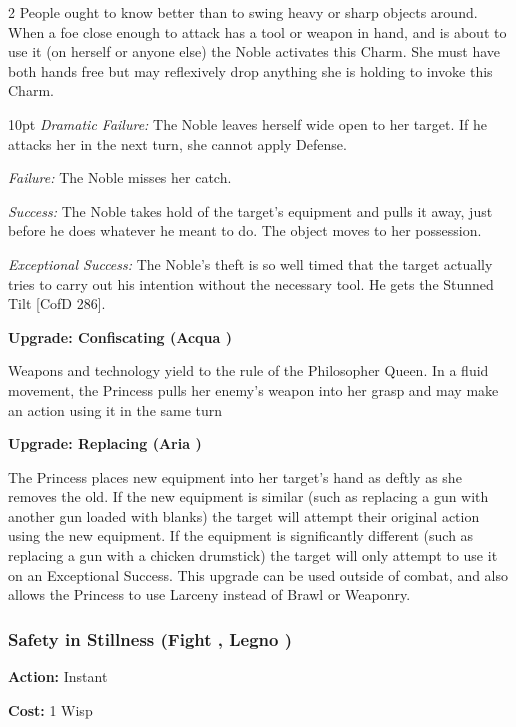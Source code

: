 \begin{multicols}{2}
\noindent People ought to know better than to swing heavy or sharp objects around. When a foe close enough to attack has a tool or weapon in hand, and is about to use it (on herself or anyone else) the Noble activates this Charm. She must have both hands free but may reflexively drop anything she is holding to invoke this Charm.

\begin{myindentpar}{10pt} 
\emph{Dramatic Failure:}  The Noble leaves herself wide open to her target. If he attacks her in the next turn, she cannot apply Defense.

\emph{Failure:} The Noble misses her catch.

\emph{Success:} The Noble takes hold of the target’s equipment and pulls it away, just before he does whatever he meant to do. The object moves to her possession.

\emph{Exceptional Success:}  The Noble’s theft is so well timed that the target actually tries to carry out his intention without the necessary tool. He gets the Stunned Tilt [CofD 286].

\textbf{Upgrade: Confiscating (Acqua \textbullet\textbullet\textbullet)}

Weapons and technology yield to the rule of the Philosopher Queen. In a fluid movement, the Princess pulls her enemy's weapon into her grasp and may make an action using it in the same turn

\textbf{Upgrade: Replacing (Aria \textbullet\textbullet\textbullet)}

The Princess places new equipment into her target's hand as deftly as she removes the old. If the new equipment is similar (such as replacing a gun  with another gun loaded with blanks) the target will attempt their original action using the new equipment. If the equipment is significantly different (such as replacing a gun with a chicken drumstick) the target will only attempt to use it on an Exceptional Success. This upgrade can be used outside of combat, and also allows the Princess to use Larceny instead of Brawl or Weaponry. \end{myindentpar}

\subsubsection*{Safety in Stillness (Fight \textbullet\textbullet, Legno \textbullet)}

\noindent \textbf{Action:} Instant

\noindent \textbf{Cost:} 1 Wisp


\end{multicols}
